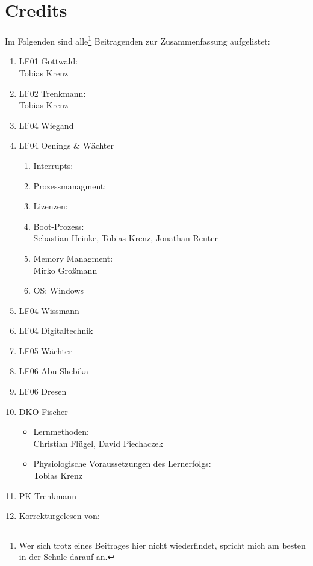 \section{Credits}
Im Folgenden sind alle\footnote{Wer sich trotz eines Beitrages hier nicht wiederfindet, spricht mich am besten in der Schule darauf an.} Beitragenden zur Zusammenfassung aufgelistet:

\begin{enumerate}
	\item LF01 Gottwald:\\
Tobias Krenz
	\item LF02 Trenkmann:\\
Tobias Krenz
	\item LF04 Wiegand
	\item LF04 Oenings \& Wächter
	\begin{enumerate}
		\item Interrupts:
		\item Prozessmanagment:
		\item Lizenzen:
		\item Boot-Prozess:\\
Sebastian Heinke, Tobias Krenz, Jonathan Reuter
		\item Memory Managment:\\
Mirko Großmann
		\item OS: Windows
	\end{enumerate}
	\item LF04 Wissmann
	\item LF04 Digitaltechnik
	\item LF05 Wächter
	\item LF06 Abu Shebika
	\item LF06 Dresen
	\item DKO Fischer
	\begin{itemize}
		\item Lernmethoden:\\
Christian Flügel, David Piechaczek
		\item Physiologische Voraussetzungen des Lernerfolgs:\\
		Tobias Krenz
	\end{itemize}
	\item PK Trenkmann
	\item Korrekturgelesen von:
\end{enumerate}
